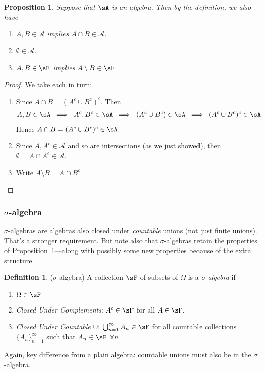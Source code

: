 \documentclass[12pt]{article}
\theoremstyle{plain}
\newtheorem{prop}[thm]{Proposition}
\theoremstyle{definition}
\newtheorem{defn}[thm]{Definition}
\theoremstyle{remark}
\begin{document}
\begin{prop}
\label{prop:algebra}
Suppose that $\sA$ is an algebra. Then by the definition, we also have
\begin{enumerate}
  \item $A,B\in\mathscr{A}$ implies $A\cap B\in \mathscr{A}$.
  \item $\emptyset \in \mathscr{A}$.
  \item $A,B\in \sF$ implies $A\setminus B \in \sF$
\end{enumerate}
\end{prop}
\begin{proof}
We take each in turn:
\begin{enumerate}
  \item Since $A\cap B = (A^c \cup B^c)^c$. Then
    \begin{align*}
      A,B\in\sA
      \;\implies\;
      A^c,B^c\in\sA
      \;\implies\;
      (A^c\cup B^c)\in\sA
      \;\implies\;
      (A^c\cup B^c)^c\in\sA
    \end{align*}
    Hence $A\cap B = (A^c \cup B^c)^c \in \sA$

  \item Since $A, A^c \in \mathscr{A}$ and so are intersections (as we
    just showed), then $\emptyset = A\cap A^c \in \mathscr{A}$.

  \item Write $A\setminus B = A \cap B^c$
\end{enumerate}
\end{proof}


\subsubsection{$\sigma$-algebra}

$\sigma$-algebras are algebras also closed under \emph{countable} unions
(not just finite unions). That's a stronger requirement.
But note also that $\sigma$-algebras retain the properties of
Proposition~\ref{prop:algebra}---along with possibly some new properties
because of the extra structure.

\begin{defn}($\sigma$-algebra)
A collection $\sF$ of subsets of $\Omega$ is a \emph{$\sigma$-algebra}
if
\begin{enumerate}
  \item $\Omega\in\sF$
  \item \emph{Closed Under Complements}:
    $A^c \in \sF$ for all $A\in\sF$.
  \item
    \emph{Closed Under Countable $\cup$}:
    $\bigcup_{n=1}^\infty A_n \in \sF$ for all countable collections
    $\{A_n\}_{n=1}^\infty$ such that $A_n\in\sF$ $\forall n$
\end{enumerate}
Again, key difference from a plain algebra: countable unions must also
be in the $\sigma$-algebra.
\end{defn}
\end{document}
